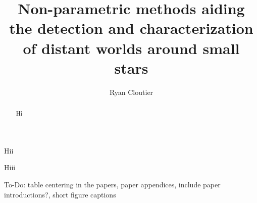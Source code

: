 \documentclass{ut-thesis}
\author{Ryan Cloutier}
\title{Non-parametric methods aiding the detection
and characterization of distant worlds around small stars}
\begin{document}
\begin{preliminary}

\maketitle

\begin{abstract}
  Hi
\end{abstract}


\begin{dedication}
  Hii
\end{dedication}
\newpage

\begin{acknowledgements}
  Hiii
\end{acknowledgements}
\newpage

\tableofcontents
\listoftables
\listoffigures

\end{preliminary}

To-Do: table centering in the papers, paper appendices, include paper introductions?, short figure captions
%
%





\end{document}
